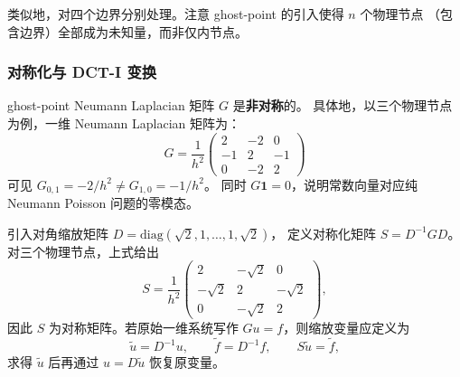 类似地，对四个边界分别处理。注意 ghost-point 的引入使得 $n$ 个物理节点
（包含边界）全部成为未知量，而非仅内节点。

\subsubsection{对称化与 DCT-I 变换}

ghost-point Neumann Laplacian 矩阵 $G$ 是\textbf{非对称}的。
具体地，以三个物理节点为例，一维 Neumann Laplacian 矩阵为：
\begin{equation}
  G = \frac{1}{h^2}
  \begin{pmatrix}
    2 & -2 & 0 \\
    -1 & 2 & -1 \\
    0 & -2 & 2
  \end{pmatrix}
\end{equation}
可见 $G_{0,1} = -2/h^2 \neq G_{1,0} = -1/h^2$。
同时 $G\mathbf{1}=0$，说明常数向量对应纯 Neumann Poisson 问题的零模态。

引入对角缩放矩阵 $D = \mathrm{diag}(\sqrt{2}, 1, \ldots, 1, \sqrt{2})$，
定义对称化矩阵 $S = D^{-1}GD$。
对三个物理节点，上式给出
\begin{equation}
  S = \frac{1}{h^2}
  \begin{pmatrix}
    2 & -\sqrt{2} & 0 \\
    -\sqrt{2} & 2 & -\sqrt{2} \\
    0 & -\sqrt{2} & 2
  \end{pmatrix},
\end{equation}
因此 $S$ 为对称矩阵。若原始一维系统写作 $Gu=f$，则缩放变量应定义为
\begin{equation}
  \tilde{u}=D^{-1}u,\qquad \tilde{f}=D^{-1}f,
  \qquad S\tilde{u}=\tilde{f},
\end{equation}
求得 $\tilde{u}$ 后再通过 $u=D\tilde{u}$ 恢复原变量。

